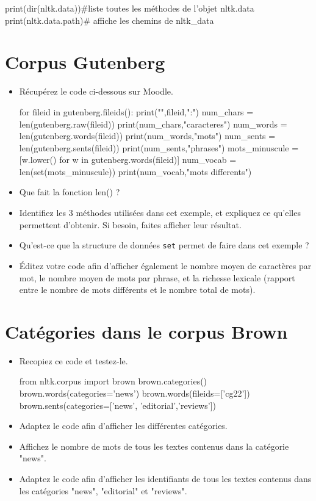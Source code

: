 \begin{python}
print(dir(nltk.data))#liste toutes les méthodes de l'objet nltk.data
print(nltk.data.path)# affiche les chemins de nltk_data
\end{python}

\section{Corpus Gutenberg}

\begin{itemize}
  \item  Récupérez le code ci-dessous sur Moodle.
\begin{python}
for fileid in gutenberg.fileids():
    print("\n",fileid,":")
    num_chars = len(gutenberg.raw(fileid))
    print(num_chars,"caracteres")
    num_words = len(gutenberg.words(fileid))
    print(num_words,"mots")
    num_sents = len(gutenberg.sents(fileid))
    print(num_sents,"phrases")
    mots_minuscule = [w.lower() for w in gutenberg.words(fileid)]
    num_vocab = len(set(mots_minuscule))
    print(num_vocab,"mots differents")
\end{python}
  \item Que fait la fonction len() ?

  \item Identifiez les 3 méthodes utilisées dans cet exemple, et expliquez ce qu'elles permettent d'obtenir. Si besoin, faites afficher leur résultat.
  \item Qu'est-ce que la structure de données \texttt{set} permet de faire dans cet exemple ?
  \item  Éditez votre code afin d'afficher également le nombre moyen de caractères par mot, le nombre moyen de mots par phrase, et la richesse lexicale (rapport entre le nombre de mots différents et le nombre total de mots).
\end{itemize}


\section{Catégories dans le corpus Brown}
\begin{itemize}
  \item  Recopiez ce code et testez-le.
\begin{python}
from nltk.corpus import brown 
brown.categories()
brown.words(categories='news')
brown.words(fileids=['cg22'])
brown.sents(categories=['news', 'editorial','reviews']) 
\end{python}
  \item  Adaptez le code afin d'afficher les différentes catégories.
  \item  Affichez le nombre de mots de tous les textes contenus dans la catégorie "news".
  \item  Adaptez le code afin d'afficher les identifiants de tous les textes contenus dans les catégories "news", "editorial" et "reviews".

\end{itemize}

